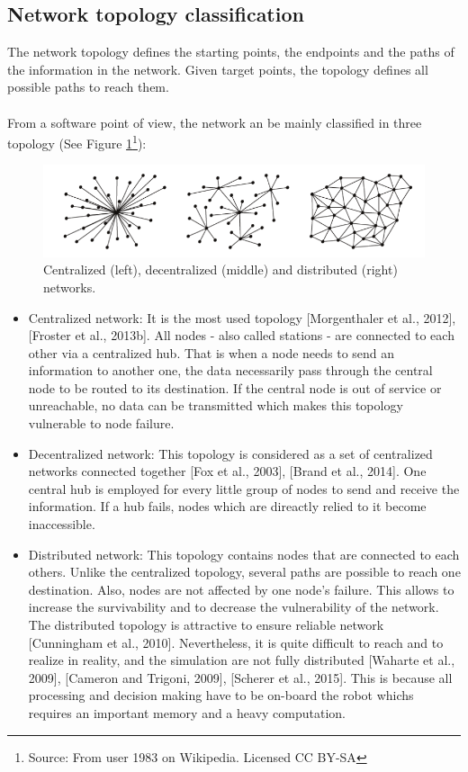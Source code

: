 \documentclass[11pt,openany]{book}
\begin{document}
\subsection{Network topology classification}
The network topology defines the starting points, the endpoints and the paths of the information in the network. Given target points, the topology defines all possible paths to reach them.\\\\
From a software point of view, the network an be mainly classified in three topology (See Figure \ref{fig:4.2}\footnote{Source: From user 1983 on Wikipedia. Licensed CC BY-SA}):
\begin{figure}[H]
    \centering
    \includegraphics[scale=0.4]{assets/4_2.png}
    \caption{Centralized (left), decentralized (middle) and distributed (right) networks.}
    \label{fig:4.2}
\end{figure}
\begin{itemize}
    \item Centralized network: It is the most used topology [Morgenthaler et al., 2012], [Froster et al., 2013b]. All nodes - also called stations - are connected to each other via a centralized hub. That is when a node needs to send an information to another one, the data necessarily pass through the central node to be routed to its destination. If the central node is out of service or unreachable, no data can be transmitted which makes this topology vulnerable to node failure.
    \item Decentralized network: This topology is considered as a set of centralized networks connected together [Fox et al., 2003], [Brand et al., 2014]. One central hub is employed for every little group of nodes to send and receive the information. If a hub fails, nodes which are direactly relied to it become inaccessible.
    \item Distributed network: This topology contains nodes that are connected to each others. Unlike the centralized topology, several paths are possible to reach one destination. Also, nodes are not affected by one node's failure. This allows to increase the survivability and to decrease the vulnerability of the network. The distributed topology is attractive to ensure reliable network [Cunningham et al., 2010]. Nevertheless, it is quite difficult to reach and to realize in reality, and the simulation are not fully distributed [Waharte et al., 2009], [Cameron and Trigoni, 2009], [Scherer et al., 2015]. This is because all processing and decision making have to be on-board the robot whichs requires an important memory and a heavy computation.
\end{itemize}
\end{document}
